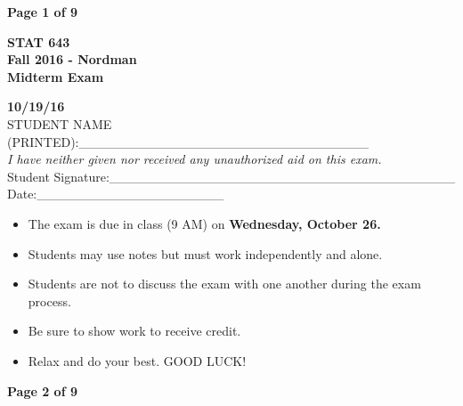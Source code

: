 \documentclass[12pt]{article}
\begin{document}
\textbf{\hspace*{1cm} \hfill Page 1 of 9}
\vspace*{3cm}
\begin{center}{\Large


\bf STAT 643  \\   Fall 2016 - Nordman \\
\vspace{.2cm}  Midterm Exam \\}
\vspace{.2cm} {\large {\bf 10/19/16}  \\
\vspace{2cm} STUDENT NAME (PRINTED):\_\_\_\_\_\_\_\_\_\_\_\_\_\_\_\_\_\_\_\_\_\_\_\_\_\_\_\_\_\_\_\\
\vspace{1.5cm} {\em I have neither given nor received any unauthorized aid on this exam.}\\
\vspace{1cm} Student
Signature:\_\_\_\_\_\_\_\_\_\_\_\_\_\_\_\_\_\_\_\_\_\_\_\_\_\_\_\_\_\_\_\_\_\_\_\_\_ Date:\_\_\_\_\_\_\_\_\_\_\_\_\_\_\_\_\_\_\_\_
}
\end{center}

\vspace*{2cm}
\begin{center}{\large

\begin{itemize}
\item The exam is due in class (9 AM) on \textbf{Wednesday, October 26.}
\item Students may use notes but must work independently and alone.
 \item Students are not to discuss the exam with one another during the exam process.
\item Be sure to show work to receive  credit.
\item Relax and do your best.  GOOD LUCK!
\end{itemize}



 }
\end{center}
\newpage
\textbf{\hspace*{1cm} \hfill Page 2 of 9}
\end{document}
